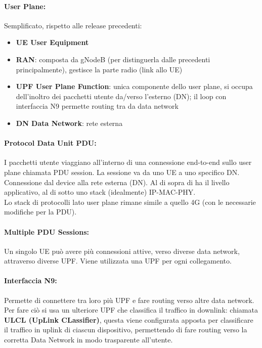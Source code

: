 \paragraph{User Plane:} Semplificato, rispetto alle release precedenti: 
\begin{itemize}
	\item \textbf{UE User Equipment}
	\item \textbf{RAN}: composta da gNodeB (per distinguerla dalle precedenti principalmente), gestisce la parte radio (link allo UE)
	\item \textbf{UPF User Plane Function}: unica componente dello user plane, si occupa dell'inoltro dei pacchetti utente da/verso l'esterno (DN); il loop con interfaccia N9 permette routing tra da data network
	\item \textbf{DN Data Network}: rete esterna
\end{itemize}

\paragraph{Protocol Data Unit PDU:} I pacchetti utente viaggiano all'interno di una connessione end-to-end sullo user plane chiamata PDU session. La sessione va da uno UE a uno specifico DN. Connessione dal device alla rete esterna (DN). Al di sopra di ha il livello applicativo, al di sotto uno stack (idealmente) IP-MAC-PHY.\\

Lo stack di protocolli lato user plane rimane simile a quello 4G (con le necessarie modifiche per la PDU).

\paragraph{Multiple PDU Sessions:} Un singolo UE può avere più connessioni attive, verso diverse data network, attraverso diverse UPF. Viene utilizzata una UPF per ogni collegamento.

\paragraph{Interfaccia N9:} Permette di connettere tra loro più UPF e fare routing verso altre data network. Per fare ciò si usa un ulteriore UPF che classifica il traffico in downlink: chiamata \textbf{ULCL (UpLink CLassifier)}, questa viene configurata apposta per classificare il traffico in uplink di ciascun dispositivo, permettendo di fare routing verso la corretta Data Network in modo trasparente all'utente.\\

